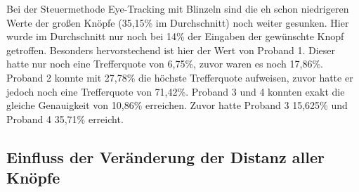 Bei der Steuermethode Eye-Tracking mit Blinzeln sind die eh schon niedrigeren Werte der großen Knöpfe (35,15\% im Durchschnitt) noch weiter gesunken. Hier wurde im Durchschnitt nur noch bei 14\% der Eingaben der gewünschte Knopf getroffen. Besonders hervorstechend ist hier der Wert von Proband 1. Dieser hatte nur noch eine Trefferquote von 6,75\%, zuvor waren es noch 17,86\%. Proband 2 konnte mit 27,78\% die höchste Trefferquote aufweisen, zuvor hatte er jedoch noch eine Trefferquote von 71,42\%. Proband 3 und 4 konnten exakt die gleiche Genauigkeit von 10,86\% erreichen. Zuvor hatte Proband 3 15,625\% und Proband 4 35,71\% erreicht. 

\subsection{Einfluss der Veränderung der Distanz aller Knöpfe}

